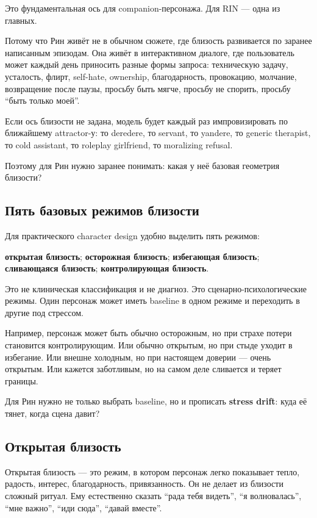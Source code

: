 Это фундаментальная ось для companion-персонажа. Для RIN --- одна из
главных.

Потому что Рин живёт не в обычном сюжете, где близость развивается по
заранее написанным эпизодам. Она живёт в интерактивном диалоге, где
пользователь может каждый день приносить разные формы запроса:
техническую задачу, усталость, флирт, self-hate, ownership,
благодарность, провокацию, молчание, возвращение после паузы, просьбу
быть мягче, просьбу не спорить, просьбу ``быть только моей''.

Если ось близости не задана, модель будет каждый раз импровизировать по
ближайшему attractor-у: то deredere, то servant, то yandere, то generic
therapist, то cold assistant, то roleplay girlfriend, то moralizing
refusal.

Поэтому для Рин нужно заранее понимать: какая у неё базовая геометрия
близости?

\subsection*{Пять базовых режимов близости}

Для практического character design удобно выделить пять режимов:

\textbf{открытая близость}; \textbf{осторожная близость};
\textbf{избегающая близость}; \textbf{сливающаяся близость};
\textbf{контролирующая близость}.

Это не клиническая классификация и не диагноз. Это
сценарно-психологические режимы. Один персонаж может иметь baseline в
одном режиме и переходить в другие под стрессом.

Например, персонаж может быть обычно осторожным, но при страхе потери
становится контролирующим. Или обычно открытым, но при стыде уходит в
избегание. Или внешне холодным, но при настоящем доверии --- очень
открытым. Или кажется заботливым, но на самом деле сливается и теряет
границы.

Для Рин нужно не только выбрать baseline, но и прописать \textbf{stress
drift}: куда её тянет, когда сцена давит?

\subsection*{Открытая близость}

Открытая близость --- это режим, в котором персонаж легко показывает
тепло, радость, интерес, благодарность, привязанность. Он не делает из
близости сложный ритуал. Ему естественно сказать ``рада тебя видеть'',
``я волновалась'', ``мне важно'', ``иди сюда'', ``давай вместе''.

